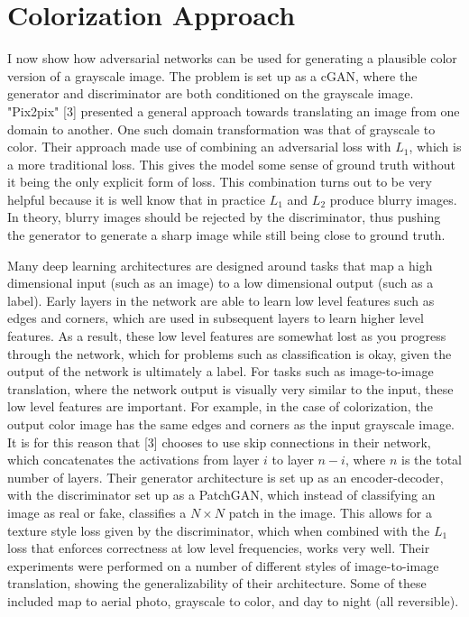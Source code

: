 \documentclass[9pt]{article}
\begin{document}
\section{Colorization Approach}
I now show how adversarial networks can be used for generating a plausible color version of a grayscale image. The problem is set up as a cGAN, where the generator and discriminator
are both conditioned on the grayscale image. "Pix2pix" [3] presented a general approach towards translating an image from one domain to another. One such domain transformation was that of
grayscale to color. Their approach made use of combining an adversarial loss with $L_1$, which is a more traditional loss. This gives the model some sense of ground truth without it
being the only explicit form of loss. This combination turns out to be very helpful because it is well know that in practice $L_1$ and $L_2$ produce blurry images. In theory, blurry
images should be rejected by the discriminator, thus pushing the generator to generate a sharp image while still being close to ground truth. \newline

\noindent Many deep learning architectures are designed around tasks that map a high dimensional input (such as an image) to a low dimensional output (such as a label). Early layers in
the network are able to learn low level features such as edges and corners, which are used in subsequent layers to learn higher level features. As a result, these low level features are
somewhat lost as you progress through the network, which for problems such as classification is okay, given the output of the network is ultimately a label. For tasks such as
image-to-image translation, where the network output is visually very similar to the input, these low level features are important. For example, in the case of colorization, the
output color image has the same edges and corners as the input grayscale image. It is for this reason that [3] chooses to use skip connections in their network, which concatenates the
activations from layer $i$ to layer $n-i$, where $n$ is the total number of layers. Their generator architecture is set up as an encoder-decoder, with the discriminator set up as a PatchGAN,
which instead of classifying an image as real or fake, classifies a $N \times N$ patch in the image. This allows for a texture style loss given by the discriminator, which when combined with
the $L_1$ loss that enforces correctness at low level frequencies, works very well. Their experiments were performed on a number of different styles of image-to-image translation, showing
the generalizability of their architecture. Some of these included map to aerial photo, grayscale to color, and day to night (all reversible). \newline
\end{document}
